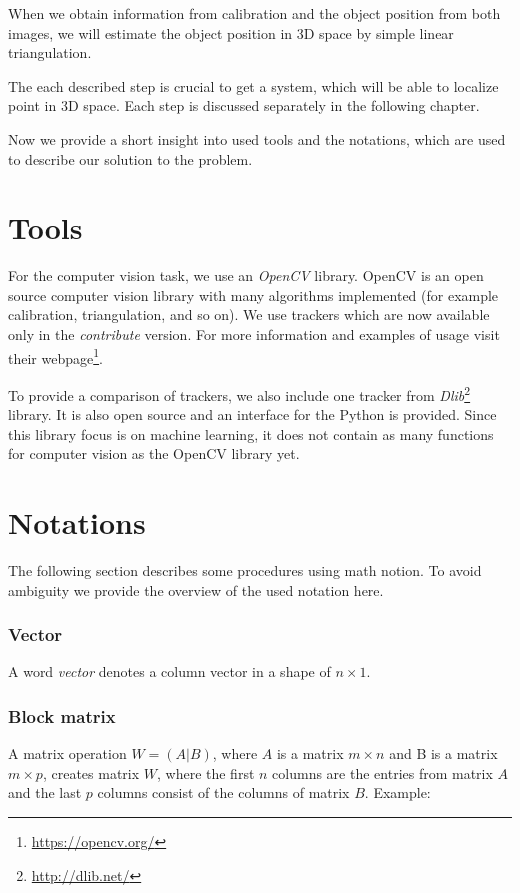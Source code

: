 When we obtain information from calibration and the object position from both
images, we will estimate the object position in 3D space by simple linear
triangulation.

The each described step is crucial to get a system, which will be able to
localize point in 3D space. Each step is discussed separately in the following
chapter.

Now we provide a short insight into used tools and the notations, which are
used to describe our solution to the problem.

\section{Tools}

For the computer vision task, we use an \emph{OpenCV} library. OpenCV is an open
source computer vision library with many algorithms implemented (for example
calibration, triangulation, and so on). We use trackers which are now available
only in the \emph{contribute} version. For more information and examples of usage
visit their webpage\footnote{\url{https://opencv.org/}}.

To provide a comparison of trackers, we also include one tracker from
\emph{Dlib}\footnote{\url{http://dlib.net/}} library. It is also open source
and an interface for the Python is provided.  Since this library focus is on
machine learning, it does not contain as many functions for computer vision
as the OpenCV library yet.

\section{Notations}

The following section describes some procedures using math notion. To avoid
ambiguity we provide the overview of the used notation here.

\subsubsection*{Vector}
A word \emph{vector} denotes a column vector in a shape of $n\times1$.

\subsubsection*{Block matrix}
A matrix operation $W = (A|B)$, where $A$ is a matrix $m \times n$ and B is a
matrix $m \times p$, creates matrix $W$, where the first $n$ columns are the entries from
matrix $A$ and the last $p$ columns consist of the columns of matrix $B$.
Example:

